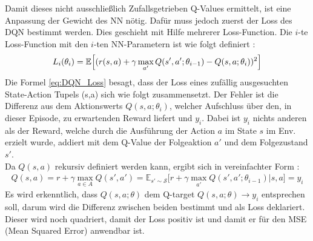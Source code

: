 Damit dieses nicht ausschließlich Zufallsgetrieben Q-Values ermittelt, ist eine Anpassung der Gewicht des NN nötig. Dafür muss jedoch zuerst der Loss des DQN bestimmt werden. Dies geschieht mit Hilfe mehrerer Loss-Function. Die $i$-te Loss-Function mit den $i$-ten NN-Parametern ist wie folgt definiert \cite{DQN}:
\begin{align}
	\label{eq:DQN_Loss}
	L_i(\theta_i) = \mathbb{E} \Bigl\lbrack (r(s,a) +\gamma \max_{a'}Q(s',a';\theta_{i-1}) - Q(s,a;\theta_i))^2 \Bigr\rbrack
\end{align}
Die Formel \ref{eq:DQN_Loss} besagt, dass der Loss eines zufällig ausgesuchten State-Action Tupels (s,a) sich wie folgt zusammensetzt. 
Der Fehler ist die Differenz aus dem Aktionswerts $Q(s,a; \theta_{i})$, welcher Aufschluss über den, in dieser Episode, zu erwartenden Reward liefert und $y_i$. Dabei ist $y_i$ nichts anderen als der Reward, welche durch die Ausführung der Action $a$ im State $s$ im Env. erzielt wurde, addiert mit dem Q-Value der Folgeaktion $a'$ und dem Folgezustand $s'$.\\
Da $Q(s,a)$ rekursiv definiert werden kann, ergibt sich in vereinfachter Form \cite[S.126]{DRL_Lapan}:
\begin{align}
	\label{eq:Q-Value_rekursive_def}
	Q(s,a) = r + \gamma \max_{a \in A}Q(s',a') = \mathbb{E}_{s' \sim \mathcal{S}} \bigl\lbrack r+\gamma \max_{a'}Q(s',a';\theta_{i-1})|s,a \bigr\rbrack = y_i
\end{align}
Es wird erkenntlich, dass $Q(s,a;\theta)$ dem Q-target $Q(s,a;\theta) \longrightarrow y_i$ entsprechen soll, darum wird die Differenz zwischen beiden bestimmt und als Loss deklariert. Dieser wird noch quadriert, damit der Loss positiv ist und damit er für den MSE (Mean Squared Error) anwendbar ist.

